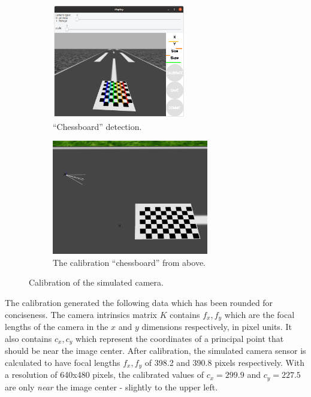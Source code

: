 \begin{figure}[ht]
    \begin{subfigure}[b]{0.48\textwidth}
        \centering
        \includegraphics[height=5cm]{images/calibration_camera_view.png}
        \caption{``Chessboard'' detection.}
        \label{subfig:calibration_camera_view}
    \end{subfigure}
    \begin{subfigure}[b]{0.48\textwidth}
        \centering
        \includegraphics[height=5cm]{images/calibration_birds_eye_view.png}
        \caption{The calibration ``chessboard'' from above.}
        \label{subfig:calibration_birds_eye_view}
    \end{subfigure}
    \caption{Calibration of the simulated camera.}
    \label{fig:camera_calibration}
\end{figure}

The calibration generated the following data which has been rounded for conciseness. The camera intrinsics matrix $K$ contains $f_x, f_y$ which are the focal lengths of the camera in the $x$ and $y$ dimensions respectively, in pixel units. It also contains $c_x, c_y$ which represent the coordinates of a principal point that should be near the image center. After calibration, the simulated camera sensor is calculated to have focal lengths $f_x, f_y$ of 398.2 and 390.8 pixels respectively. With a resolution of 640x480 pixels, the calibrated values of $c_x=299.9$ and $c_y=227.5$ are only \textit{near} the image center - slightly to the upper left.

